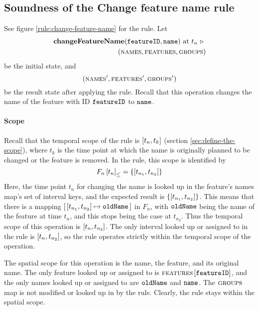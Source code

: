\subsection{Soundness of the Change feature name rule} 
\label{sub:soundness-of-the-change-feature-name-rule}

See figure \vref{rule:change-feature-name} for the  rule. Let 
\begin{equation*}
   \begin{split}
      \textbf{changeFeatureName}(\texttt{featureID}, \texttt{name}) \text{ at } t_n \ \triangleright \  \\
      (\textsc{names}, \textsc{features}, \textsc{groups}{})
   \end{split}
\end{equation*}
be the initial state, and
\[
   (\textsc{names}', \textsc{features}', \textsc{groups}{}')
\]
be the result state after applying the  rule. Recall that this operation changes the name of the feature with ID $\texttt{featureID}$ to $\texttt{name}$.

\paragraph{Scope}
Recall that the temporal scope of the  rule is $\interval{t_n}{t_k}$ (section \vref{sec:define-the-scope}), where $t_k$ is the time point at which the name is originally planned to be changed or the feature is removed. In the rule, this scope is identified by 
   \[
      \containing{F_n}{t_n} = \set{\interval{t_{n_1}}{t_{n_2}}}
   \]
   Here, the time point $t_n$ for changing the name is looked up in the feature's names map's set of interval keys, and the expected result is $\set{\interval{t_{n_1}}{t_{n_2}}}$. This means that there is a mapping $\intervalmapping{t_{n_1}}{t_{n_2}}{\var{oldName}}$ in $F_n$, with $\texttt{oldName}$ being the name of the feature at time $t_n$, and this stops being the case at $t_{n_2}$. Thus the temporal scope of this operation is $\interval{t_n}{t_{n_2}}$. The only interval looked up or assigned to in the rule is $\interval{t_n}{t_{n_2}}$, so the rule operates strictly within the temporal scope of the operation.

   The spatial scope for this operation is the name, the feature, and its original name. The only feature looked up or assigned to is $\textsc{features} \left[ \texttt{featureID} \right]$, and the only names looked up or assigned to are $\texttt{oldName}$ and $\texttt{name}$. The $\textsc{groups}{}{}$ map is not modified or looked up in by the rule. Clearly, the rule stays within the spatial scope.
\\

